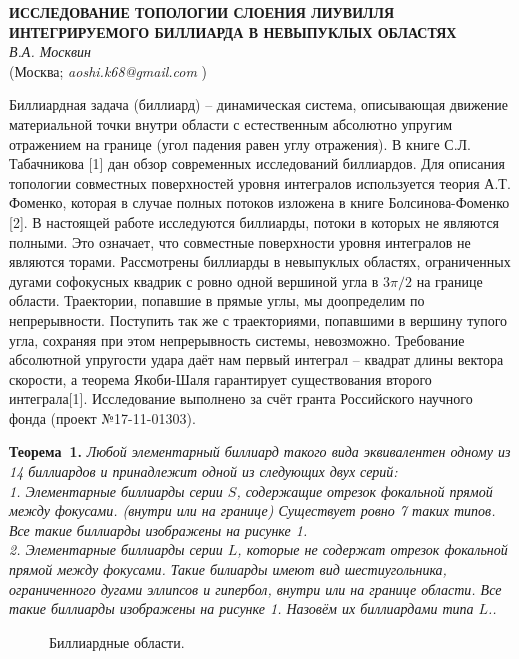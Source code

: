 \begin{center}{ \bf  ИССЛЕДОВАНИЕ ТОПОЛОГИИ СЛОЕНИЯ ЛИУВИЛЛЯ ИНТЕГРИРУЕМОГО БИЛЛИАРДА В НЕВЫПУКЛЫХ ОБЛАСТЯХ}\\
{\it В.А. Москвин } \\
(Москва; {\it aoshi.k68@gmail.com} )
\end{center}

Биллиардная задача (биллиард) -- динамическая система, описывающая движение материальной точки внутри области с естественным абсолютно упругим отражением на границе (угол падения равен углу отражения). В книге С.Л. Табачникова [1] дан обзор современных исследований биллиардов. Для описания топологии совместных поверхностей уровня интегралов используется теория А.Т. Фоменко, которая в случае полных потоков изложена в книге Болсинова-Фоменко [2]. В настоящей работе ис\-следуют\-ся биллиарды, потоки в которых не являются полными. Это означает, что совместные поверхности уровня интегралов не являются торами. Рассмотрены биллиарды в невыпуклых областях, ограниченных дугами софокусных квадрик с ровно одной вершиной угла в $3\pi/2$ на границе области.
Траектории, попавшие в прямые углы, мы доопределим по непрерывности. Поступить так же с траекториями, попавшими в вершину тупого угла, сохраняя при этом непрерывность системы, невозможно.
Требование абсолютной упругости удара даёт нам первый интеграл -- квадрат длины вектора скорости, а теорема Якоби-Шаля гарантирует существования второго интеграла[1]. Исследование выполнено за счёт гранта Российского научного фонда (проект №17-11-01303).

\textbf{Теорема~1.} {\it 	Любой элементарный биллиард такого вида эквивалентен одному из 14 биллиардов и принадлежит одной из следующих двух серий: \\
	1. Элементарные биллиарды серии $S$, содержащие отрезок фокальной прямой между фокусами. (внутри или на границе) Существует ровно 7 таких типов. Все такие биллиарды изображены на рисунке 1. \\
	2. Элементарные биллиарды серии $L$, которые не содержат отрезок фокальной прямой между фокусами. Такие билиарды имеют вид шестиугольника, ограниченного дугами эллипсов и гипербол, внутри или на границе области. Все такие биллиарды изображены на рисунке 1. Назовём их биллиардами типа $L$..} \\

\begin{figure}[h]
	\caption{Биллиардные области.}
\end{figure}

